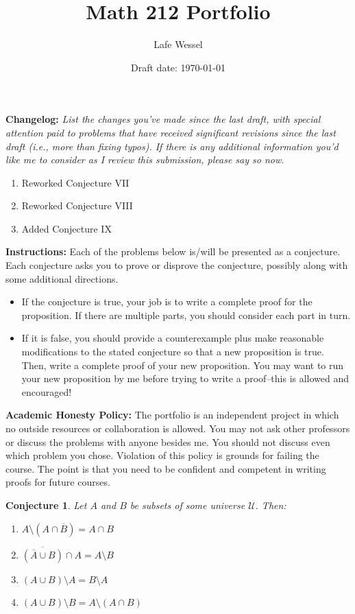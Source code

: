 \documentclass[11pt,titlepage]{article}		%
\title{\sc Math 212 Portfolio}
\author{Lafe Wessel}
\date{Draft date: \today}
\theoremstyle{theorem}
\newtheorem{conjecture}[theorem]{Conjecture}
\begin{document}
\maketitle


\noindent\textbf{Changelog:} \emph{List the changes you've made since the last draft, with special attention paid to problems that have received significant revisions since the last draft (i.e., more than fixing typos). If there is any additional information you'd like me to consider as I review this submission, please say so now.}

\begin{enumerate}
\item Reworked Conjecture VII
\item Reworked Conjecture VIII
\item Added Conjecture IX
\end{enumerate}

\noindent\textbf{Instructions:} Each of the problems below is/will be presented as a conjecture. Each conjecture asks you to prove or disprove the conjecture, possibly along with some additional directions. 

\bigskip

\begin{itemize}  
	\item If the conjecture is true, your job is to write a complete proof for the proposition. If there are multiple parts, you should consider each part in turn.
	\item If it is false, you should provide a counterexample plus make reasonable modifications to the stated conjecture so that a new proposition is true. Then, write a complete proof of your new proposition. You may want to run your new proposition by me before trying to write a proof--this is allowed and encouraged!
\end{itemize}


\noindent\textbf{Academic Honesty Policy:}
The portfolio is an independent project in which no outside resources or collaboration is allowed. You may not ask other professors or discuss the problems with anyone besides me. You should not discuss even which problem you chose. Violation of this policy is grounds for failing the course. The point is that you need to be confident and competent in writing proofs for future courses.






\clearpage

\begin{conjecture}
	Let $A$ and $B$ be subsets of some universe $\mathcal{U}$.
	Then:
	\begin{enumerate}
		\item $A\setminus (A\cap \overline{B}) = A\cap B$
		\item $\overline{(\overline{A}\cup B)} \cap A = A\setminus B$
		\item $(A\cup B)\setminus A = B\setminus A$
		\item $(A\cup B) \setminus B = A\setminus (A\cap B)$
	\end{enumerate}
\end{conjecture}
\end{document}
